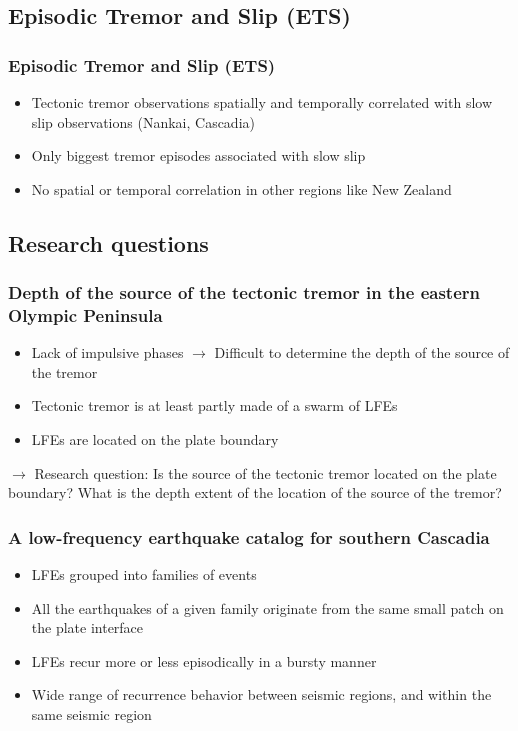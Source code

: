 \documentclass{beamer}
\begin{document}
	\subsection{Episodic Tremor and Slip (ETS)}

	\begin{frame}
		\frametitle{Episodic Tremor and Slip (ETS)}
		\begin{itemize}
			\item Tectonic tremor observations spatially and temporally correlated with slow slip observations (Nankai, Cascadia)
			\item Only biggest tremor episodes associated with slow slip
			\item No spatial or temporal correlation in other regions like New Zealand
		\end{itemize}
	\end{frame}

	
	\subsection{Research questions}

	\begin{frame}
		\frametitle{Depth of the source of the tectonic tremor in the eastern Olympic Peninsula}
		\begin{itemize}
			\item Lack of impulsive phases $\rightarrow$ Difficult to determine the depth of the source of the tremor
			\item Tectonic tremor is at least partly made of a swarm of LFEs
			\item LFEs are located on the plate boundary
		\end{itemize}

		\begin{block}{}
			$\rightarrow$ Research question: Is the source of the tectonic tremor located on the plate boundary? What is the depth extent of the location of the source of the tremor?
		\end{block}
	\end{frame}

	\begin{frame}
		\frametitle{A low-frequency earthquake catalog for southern Cascadia}
		\begin{itemize}
			\item LFEs grouped into families of events
			\item All the earthquakes of a given family originate from the same small patch on the plate interface
			\item LFEs recur more or less episodically in a bursty manner
			\item Wide range of recurrence behavior between seismic regions, and within the same seismic region
		\end{itemize}
	\end{frame}
\end{document}
